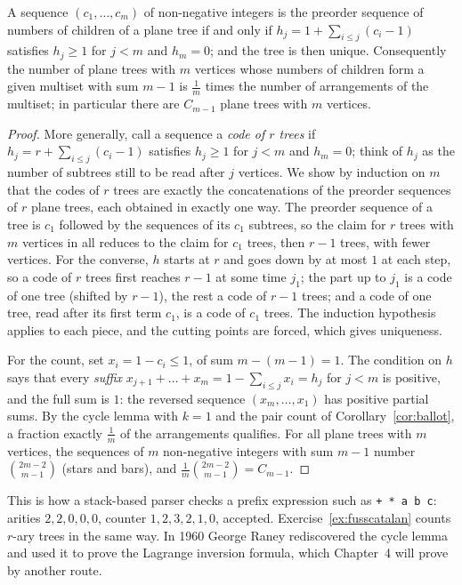 \begin{proposition}\label{prop:lukasiewicz}
A sequence $(c_1,\dots,c_m)$ of non-negative integers is the preorder sequence of numbers of children of a plane tree if and
only if $h_j=1+\sum_{i\le j}(c_i-1)$ satisfies $h_j\ge1$ for $j<m$ and $h_m=0$; and the tree is then unique. Consequently the number of plane
trees with $m$ vertices whose numbers of children form a given multiset with sum $m-1$ is $\frac1m$ times the number of
arrangements of the multiset; in particular there are $C_{m-1}$ plane trees with $m$ vertices.
\end{proposition}
\begin{proof}
More generally, call a sequence a \emph{code of $r$ trees} if $h_j=r+\sum_{i\le j}(c_i-1)$ satisfies $h_j\ge1$ for $j<m$ and $h_m=0$; think of $h_j$ as the
number of subtrees still to be read after $j$ vertices. We show by induction on $m$ that the codes of $r$ trees are exactly the
concatenations of the preorder sequences of $r$ plane trees, each obtained in exactly one way. The preorder sequence of a tree
is $c_1$ followed by the sequences of its $c_1$ subtrees, so the claim for $r$ trees with $m$ vertices in all reduces to the claim for $c_1$
trees, then $r-1$ trees, with fewer vertices. For the converse, $h$ starts at $r$ and goes down by at most $1$ at each step, so a code of $r$
trees first reaches $r-1$ at some time $j_1$; the part up to $j_1$ is a code of one tree (shifted by $r-1$), the rest a code of $r-1$ trees; and
a code of one tree, read after its first term $c_1$, is a code of $c_1$ trees. The induction hypothesis applies to each piece, and the
cutting points are forced, which gives uniqueness.

For the count, set $x_i=1-c_i\le1$, of sum $m-(m-1)=1$. The condition on $h$ says that every \emph{suffix} $x_{j+1}+\dots+x_m=1-\sum_{i\le j}x_i=h_j$ for
$j<m$ is positive, and the full sum is $1$: the reversed sequence $(x_m,\dots,x_1)$ has positive partial sums. By the cycle lemma with $k=1$
and the pair count of Corollary~\ref{cor:ballot}, a fraction exactly $\frac1m$ of the arrangements qualifies. For all plane trees with $m$
vertices, the sequences of $m$ non-negative integers with sum $m-1$ number $\binom{2m-2}{m-1}$ (stars and bars), and $\frac1m\binom{2m-2}{m-1}=C_{m-1}$.
\end{proof}

This is how a stack-based parser checks a prefix expression such as \texttt{+ * a b c}: arities $2,2,0,0,0$, counter
$1,2,3,2,1,0$, accepted. Exercise~\ref{ex:fusscatalan} counts $r$-ary trees in the same way. In 1960 George Raney rediscovered the
cycle lemma and used it to prove the Lagrange inversion formula, which Chapter~4 will prove by another route.

